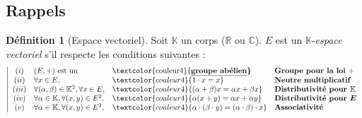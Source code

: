 \documentclass[11pt,a4paper]{report}
\theoremstyle{definition}
\newtheorem{dfn}[theorem]{Définition}
\begin{document}
\subsection{Rappels} %
\label{sub:rappels}
\begin{dfn}[Espace vectoriel]
     Soit $\mathbb{K}$ un corps ($\ensuremath{\mathbb{R}}$ ou $\ensuremath{\mathbb{C}}$).\newline
     $E$ est un $\mathbb{K}$-\emph{espace vectoriel} s'il respecte les conditions suivantes : 
     \begin{equation}
        \left| 
      \begin{array}{c l l l}
       (i)  &(E,+) \text{ est un }&\text{\textcolor{couleur4}{\bf\underline{groupe abélien}}}&\textbf{Groupe pour la loi }+\\
       (ii) &\forall x\in E,& \textcolor{couleur4}{{1\cdot x = x}}&\textbf{Neutre multiplicatif}\\
       (iii) &\forall (\alpha, \beta) \in \mathbb{K}^2, \forall x\in E,& \textcolor{couleur4}{{(\alpha + \beta) x = \alpha x + \beta x}} &\textbf{Distributivité pour }\boldsymbol{\mathbb{K}} \\
       (iv) &\forall \alpha \in \mathbb{K}, \forall (x,y) \in E^2,& \textcolor{couleur4}{{\alpha (x+y) = \alpha x + \alpha y}} &\textbf{Distributivité pour }\boldsymbol{E}\\
       (v) &\forall \alpha \in \mathbb{K}, \forall (x,y) \in E^2,& \textcolor{couleur4}{{\alpha \cdot (\beta \cdot y) = (\alpha \cdot \beta ) \cdot x}} &\textbf{Associativité}
      \end{array}
        \right.
     \end{equation}
     
\end{dfn}

\end{document}
